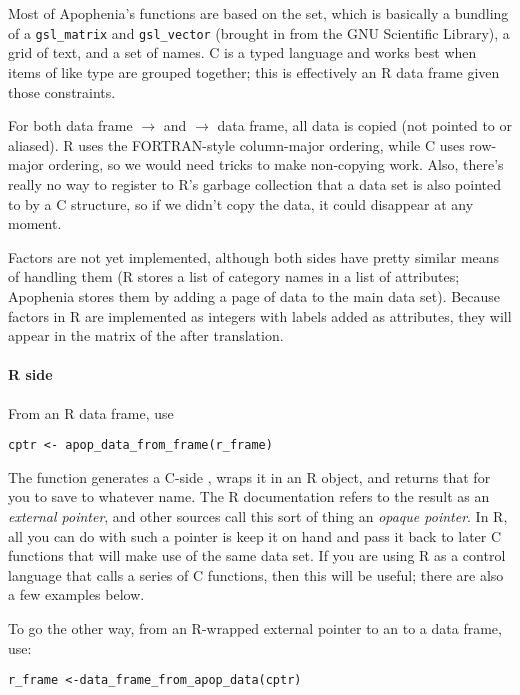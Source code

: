 \documentclass{article}
\begin{document}
\section{\ad} Most of Apophenia's functions are based on the \ad set, which is basically a
bundling of a {\tt gsl\_matrix} and {\tt gsl\_vector} (brought in from the GNU Scientific
Library), a grid of text, and a set of names. C is a typed language and works best when
items of like type are grouped together; this is effectively an R data frame given those
constraints.

For both data frame $\to$ \ad and \ad $\to$ data frame, all data is copied (not pointed
to or aliased).  R uses the FORTRAN-style column-major ordering, while C uses row-major
ordering, so we would need tricks to make non-copying work. Also, there's really no
way to register to R's garbage collection that a data set is also pointed to by a C
structure, so if we didn't copy the data, it could disappear at any moment.

Factors are not yet implemented, although both sides have pretty similar means of handling
them (R stores a list of category names in  a list of attributes; Apophenia stores them
by adding a page of data to the main data set). Because factors in R are implemented
as integers with labels added as attributes, they will appear in the matrix of the
\ad after translation.

\paragraph{R side} From an R data frame, use 
\begin{verbatim}
cptr <- apop_data_from_frame(r_frame)
\end{verbatim}
The function generates a C-side \ad, wraps it in an R object, and returns that for you to
save to whatever name. The R documentation
refers to the result as an {\em external pointer}, and other sources call this sort of
thing an {\em opaque pointer}. In R, all you can do with such a pointer is keep it on hand
and pass it back to later C functions that will make use of the same data set. If you are
using R as a control language that calls a series of C functions, then this will be
useful; there are also a few examples below.

To go the other way, from an R-wrapped external pointer to an \ad to a data frame, use:

\begin{verbatim}
r_frame <-data_frame_from_apop_data(cptr)
\end{verbatim}
\end{document}
